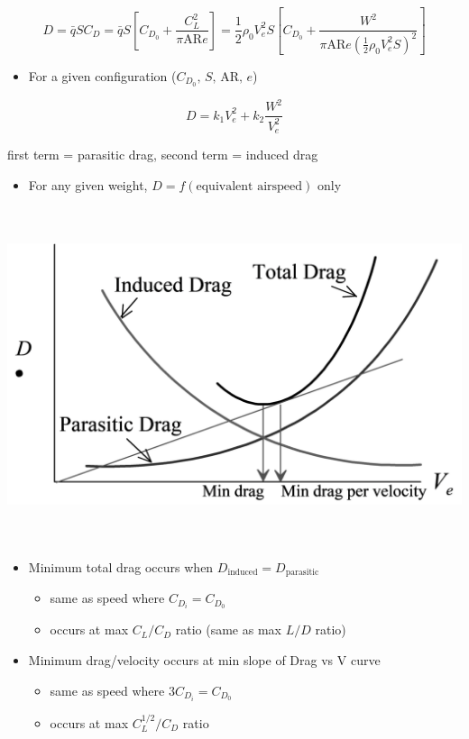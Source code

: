 \documentclass[
]{book}
\providecommand{\tightlist}{%
  \setlength{\itemsep}{0pt}\setlength{\parskip}{0pt}}
\begin{document}
\[D = \bar{q}SC_D = \bar{q}S \left[C_{D_0} + \frac{C_L^2}{\pi \mathrm{AR} e} \right] = \frac{1}{2}\rho_0 V_e^2 S\left[C_{D_0} + \frac{W^2}{\pi \mathrm{AR} e \left(\frac{1}{2} \rho_0 V_e^2 S \right)^2} \right]\]

\begin{itemize}
\tightlist
\item
  For a given configuration (\(C_{D_0} \text{, } S \text{, } \mathrm{AR} \text{, } e\))
\end{itemize}

\[D = k_1 V_e^2 + k_2 \frac{W^2}{V_e^2} \]

first term = parasitic drag, second term = induced drag

\begin{itemize}
\tightlist
\item
  For any given weight, \(D = f(\text{equivalent airspeed})\) only
\end{itemize}

\includegraphics[width=6.7143in,height=3.875in]{media/05/image95.svg}

\begin{itemize}
\tightlist
\item
  Minimum total drag occurs when \(D_{\mathrm{induced}} = D_{\mathrm{parasitic}}\)

  \begin{itemize}
  \tightlist
  \item
    same as speed where \(C_{D_i} = C_{D_0}\)
  \item
    occurs at max \(C_L/C_D\) ratio (same as max \(L/D\) ratio)
  \end{itemize}
\item
  Minimum drag/velocity occurs at min slope of Drag vs V curve

  \begin{itemize}
  \tightlist
  \item
    same as speed where \(3C_{D_i} = C_{D_0}\)
  \item
    occurs at max \(C_L^{1/2}/C_D\) ratio
  \end{itemize}
\end{itemize}
\end{document}

